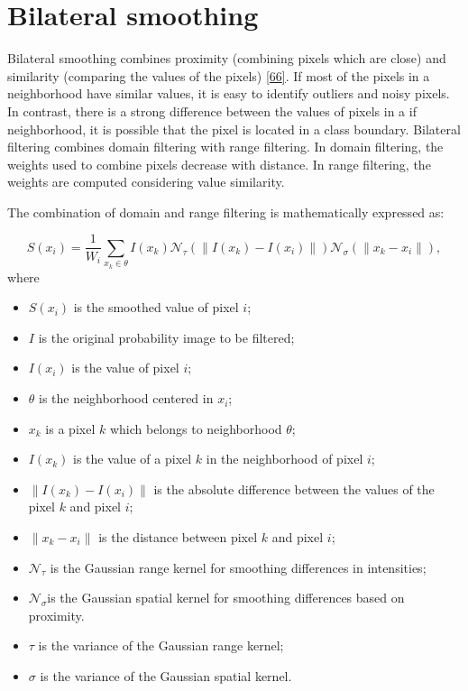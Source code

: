 \documentclass[
  11pt,
]{report}
\providecommand{\tightlist}{%
  \setlength{\itemsep}{0pt}\setlength{\parskip}{0pt}}
\begin{document}
\hypertarget{bilateral-smoothing-1}{%
\section{Bilateral smoothing}\label{bilateral-smoothing-1}}

Bilateral smoothing combines proximity (combining pixels which are
close) and similarity (comparing the values of the pixels)
\protect\hyperlink{ref-Tomasi1998}{{[}66{]}}. If most of the pixels in a
neighborhood have similar values, it is easy to identify outliers and
noisy pixels. In contrast, there is a strong difference between the
values of pixels in a if neighborhood, it is possible that the pixel is
located in a class boundary. Bilateral filtering combines domain
filtering with range filtering. In domain filtering, the weights used to
combine pixels decrease with distance. In range filtering, the weights
are computed considering value similarity.

The combination of domain and range filtering is mathematically
expressed as:

\[
S(x_i) = \frac{1}{W_{i}} \sum_{x_k \in \theta} I(x_k)\mathcal{N}_{\tau}(\|I(x_k) - I(x_i)\|)\mathcal{N}_{\sigma}(\|x_k - x_i\|),
\] where

\begin{itemize}
\tightlist
\item
  \(S(x_i)\) is the smoothed value of pixel \(i\);
\item
  \(I\) is the original probability image to be filtered;
\item
  \(I(x_i)\) is the value of pixel \(i\);
\item
  \(\theta\) is the neighborhood centered in \(x_i\);
\item
  \(x_k\) is a pixel \(k\) which belongs to neighborhood \(\theta\);
\item
  \(I(x_k)\) is the value of a pixel \(k\) in the neighborhood of pixel
  \(i\);
\item
  \(\|I(x_k) - I(x_i)\|\) is the absolute difference between the values
  of the pixel \(k\) and pixel \(i\);
\item
  \(\|x_k - x_i\|\) is the distance between pixel \(k\) and pixel \(i\);
\item
  \(\mathcal{N}_{\tau}\) is the Gaussian range kernel for smoothing
  differences in intensities;
\item
  \(\mathcal{N}_{\sigma}\)is the Gaussian spatial kernel for smoothing
  differences based on proximity.
\item
  \(\tau\) is the variance of the Gaussian range kernel;
\item
  \(\sigma\) is the variance of the Gaussian spatial kernel.
\end{itemize}
\end{document}
